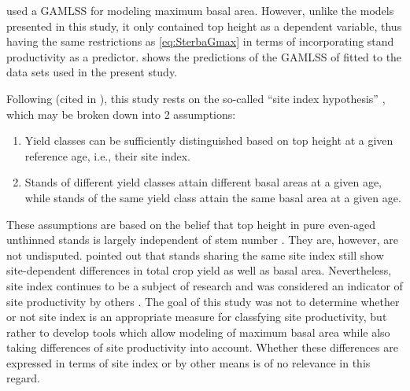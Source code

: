 \textcite{Woerdehoff2016} used a GAMLSS for modeling maximum basal area.  However, unlike the models presented in this study, it only contained top height as a dependent variable, thus having the same restrictions as \eqref{eq:SterbaGmax} in terms of incorporating stand productivity as a predictor.   shows the predictions of the GAMLSS of \textcite{Woerdehoff2016} fitted to the data sets used in the present study.  %



Following \textcite{Baur1881} (cited in \textcite[p. 159]{Assmann1970}), this study rests on the so-called “site index hypothesis” \parencite{Skovsgaard2008}, which may be broken down into 2 assumptions:
\begin{enumerate}
\item Yield classes can be sufficiently distinguished based on top height at a given reference age, i.e., their site index.
\item Stands of different yield classes attain different basal areas at a given age, while stands of the same yield class attain the same basal area at a given age.
\end{enumerate}
These assumptions are based on the belief that top height in pure even-aged unthinned stands is largely independent of stem number \parencite{Skovsgaard2008}.  
They are, however, are not undisputed.  \textcite{Assmann1970} pointed out that stands sharing the same site index still show site-dependent differences in total crop yield as well as basal area.  Nevertheless, site index continues to be a subject of research \parencite{Weiskittel2011,Somarriba2001,Wang2005} and was considered an indicator of site productivity by others \parencite{Monserud1984,Rayner1992,Karlsson1997}.  The goal of this study was not to determine whether or not site index is an appropriate measure for classfying site productivity, but rather to develop tools which allow modeling of maximum basal area while also taking differences of site productivity into account.  Whether these differences are expressed in terms of site index or by other means is of no relevance in this regard.

